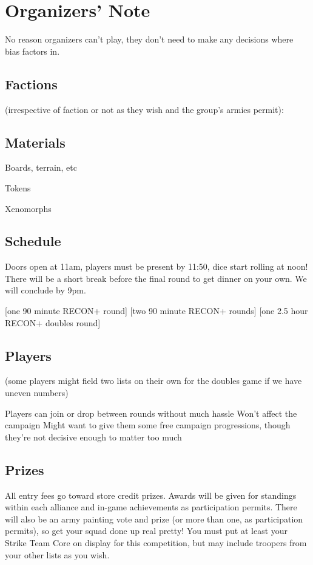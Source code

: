 \chapter{Organizers' Note}

No reason organizers can't play, they don't need to make any decisions
where bias factors in.

\section{Factions}

 (irrespective of faction or not as they wish and the
 group's armies permit):
 
\section{Materials}

Boards, terrain, etc

Tokens

Xenomorphs



\section{Schedule}

Doors open at 11am, players must be present by 11:50, dice start
rolling at noon! There will be a short break before the final round to
get dinner on your own. We will conclude by 9pm.

[one 90 minute RECON+ round]
[two 90 minute RECON+ rounds]
[one 2.5 hour RECON+ doubles round]

\section{Players}

(some players might field two lists on their own for the doubles game if we have uneven numbers)

Players can join or drop between rounds without much hassle Won't
affect the campaign Might want to give them some free campaign
progressions, though they're not decisive enough to matter too much

\section{Prizes}

All entry fees go toward store credit prizes. Awards will be given for
standings within each alliance and in-game achievements as
participation permits. There will also be an army painting vote and
prize (or more than one, as participation permits), so get your squad
done up real pretty! You must put at least your Strike Team Core on
display for this competition, but may include troopers from your other
lists as you wish.
